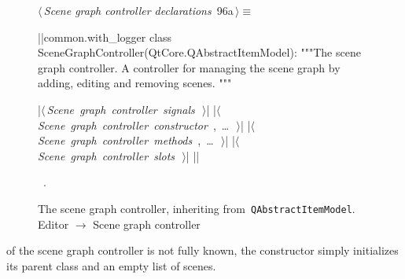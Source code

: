 \documentclass[%
    a4paper,    %
    justified,  %
    nobib,      %
    openany     %
]{tufte-book}
\makeatletter
\renewcommand{\label}[1]{\@tufte@label{##1}}%
\makeatother
\begin{document}
\begin{figure}[!htbp]
\begin{flushleft} \small
\begin{minipage}{\linewidth}\label{scrap25}\raggedright\small
{} $\langle\,${\itshape Scene graph controller declarations}\nobreak\ {\footnotesize {96a}}$\,\rangle\equiv$
\vspace{-1ex}
\begin{pythoncode}
|\normalfont{}\fontfamily{}|common.with_logger
class SceneGraphController(QtCore.QAbstractItemModel):
    """The scene graph controller.
    A controller for managing the scene graph by adding,
    editing and removing scenes.
    """

    |\hbox{$\langle\,${\itshape Scene graph controller signals}\nobreak\ {\footnotesize {}}$\,\rangle$}|
    |\hbox{$\langle\,${\itshape Scene graph controller constructor}\nobreak\ {\footnotesize {}, \ldots\ }$\,\rangle$}|
    |\hbox{$\langle\,${\itshape Scene graph controller methods}\nobreak\ {\footnotesize {}, \ldots\ }$\,\rangle$}|
    |\hbox{$\langle\,${\itshape Scene graph controller slots}\nobreak\ {\footnotesize {}}$\,\rangle$}|
|\NWsep|
\end{pythoncode}
\vspace{1.5ex}
\footnotesize
\begin{list}{}{\setlength{\itemsep}{-\parsep}\setlength{\itemindent}{-\leftmargin}}
\item \NWtxtMacroRefIn\ .

\item{}
\end{list}
\end{minipage}\vspace{4ex}
\end{flushleft}
\caption{The scene graph controller, inheriting from~\texttt{QAbstractItemModel}.
  \newline{}\newline{}Editor $\rightarrow$ Scene graph controller}
\end{figure}

 of the scene graph controller is
not fully known, the constructor simply initializes its parent class and an
empty list of scenes.
\end{document}
